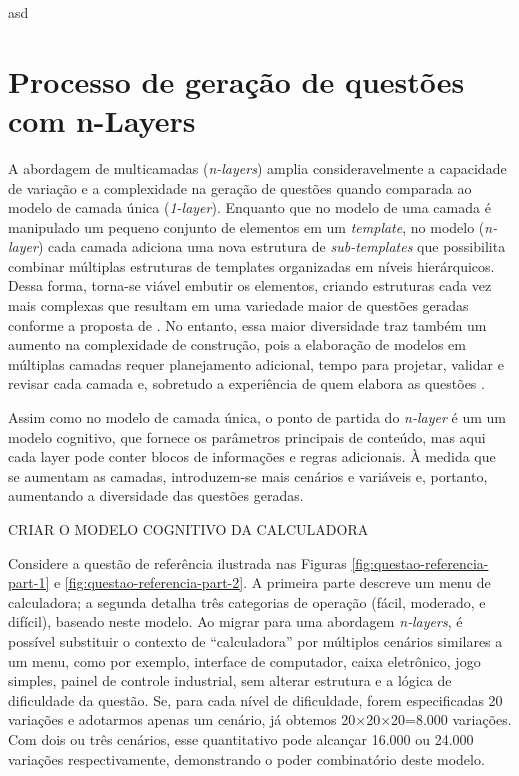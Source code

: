asd

\section{Processo de geração de questões com  n-Layers}

A abordagem de multicamadas (\textit{n-layers}) amplia consideravelmente a capacidade de variação e a complexidade na geração de questões quando comparada ao modelo de camada única (\textit{1-layer}).  Enquanto que no modelo de uma camada é manipulado um pequeno conjunto de elementos em um \textit{template}, no modelo (\textit{n-layer}) cada camada adiciona uma nova estrutura de \textit{sub-templates} que possibilita combinar múltiplas estruturas de templates organizadas em níveis hierárquicos. Dessa forma, torna-se viável embutir os elementos, criando estruturas cada vez mais complexas que resultam em uma variedade maior  de questões geradas conforme a proposta de  \parencite{lai2013}. No entanto, essa maior diversidade traz também um aumento na complexidade de construção, pois a elaboração de modelos em múltiplas camadas requer planejamento adicional, tempo para projetar, validar e revisar cada camada e, sobretudo a experiência de quem elabora as questões \parencite{gierl2021}. 

Assim como no modelo de camada única, o ponto de partida do \textit{n-layer} é um um modelo cognitivo, que fornece os parâmetros principais de conteúdo, mas aqui cada layer pode conter blocos de informações e regras adicionais. À medida que se aumentam as camadas, introduzem-se mais cenários e variáveis e, portanto, aumentando a diversidade das questões geradas.

 CRIAR O MODELO COGNITIVO DA CALCULADORA 

Considere a questão de referência ilustrada nas Figuras \ref{fig:questao-referencia-part-1} e \ref{fig:questao-referencia-part-2}. A primeira parte descreve um menu de calculadora; a segunda detalha três categorias de operação (fácil, moderado, e difícil), baseado neste modelo. Ao migrar para uma abordagem \textit{n‑layers}, é possível substituir o contexto de “calculadora” por múltiplos cenários similares a um menu, como por exemplo, interface de computador, caixa eletrônico, jogo simples, painel de controle industrial, sem alterar estrutura e a lógica de dificuldade da questão. Se, para cada nível de dificuldade, forem especificadas 20 variações e adotarmos apenas um cenário, já obtemos 20×20×20=8.000 variações. Com dois ou três cenários, esse quantitativo pode alcançar 16.000 ou 24.000 variações respectivamente, demonstrando o poder combinatório deste modelo.



